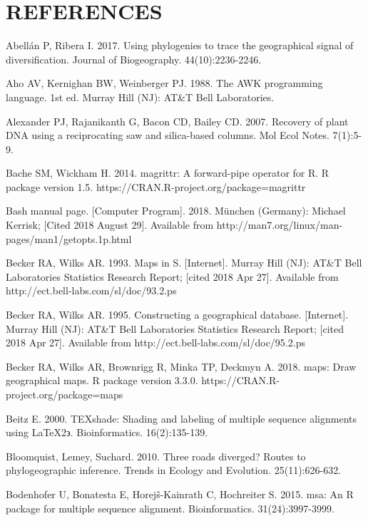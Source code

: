 \chapter*{REFERENCES}
\vspace*{-12pt}

\setlength{\parindent}{-4em}
\setlength{\leftskip}{4em}
\setlength{\parskip}{12pt}
\singlespacing

\hspace*{-4em}

Abellán P, Ribera I. 2017. Using phylogenies to trace the geographical signal of diversification. Journal of Biogeography. 44(10):2236-2246.

Aho AV, Kernighan BW, Weinberger PJ. 1988. The AWK programming language. 1st ed. Murray Hill (NJ): AT\&T Bell Laboratories.

Alexander PJ, Rajanikanth G, Bacon CD, Bailey CD. 2007. Recovery of plant DNA using a reciprocating saw and silica-based columns. Mol Ecol Notes. 7(1):5-9.

Bache SM, Wickham H. 2014. magrittr: A forward-pipe operator for R. R package version 1.5. https://CRAN.R-project.org/package=magrittr

Bash manual page. [Computer Program]. 2018. München (Germany): Michael Kerrisk; [Cited 2018 August 29].  Available from http://man7.org/linux/man-pages/man1/getopts.1p.html

Becker RA, Wilks AR. 1993. Maps in S. [Internet]. Murray Hill (NJ): AT\&T Bell Laboratories Statistics Research Report; [cited 2018 Apr 27]. Available from http://ect.bell-labs.com/sl/doc/93.2.ps

Becker RA, Wilks AR. 1995. Constructing a geographical database. [Internet]. Murray Hill (NJ): AT\&T Bell Laboratories Statistics Research Report; [cited 2018 Apr 27]. Available from http://ect.bell-labs.com/sl/doc/95.2.ps

Becker RA, Wilks AR, Brownrigg R, Minka TP, Deckmyn A. 2018. maps: Draw geographical maps. R package version 3.3.0. https://CRAN.R-project.org/package=maps

Beitz E. 2000. TEXshade: Shading and labeling of multiple sequence alignments using \LaTeX 2$\backepsilon$. Bioinformatics. 16(2):135-139.

Bloomquist, Lemey, Suchard. 2010. Three roads diverged? Routes to phylogeographic inference. Trends in Ecology and Evolution. 25(11):626-632.

Bodenhofer U, Bonatesta E, Horej\v{s}-Kainrath C, Hochreiter S. 2015. msa: An R package for multiple sequence alignment. Bioinformatics. 31(24):3997-3999.


